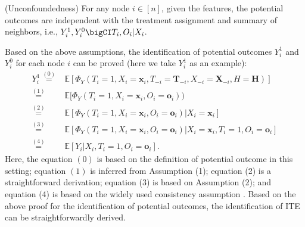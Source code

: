 \begin{assumption}
(Unconfoundedness) For any node $i\in[n]$, given the features, the potential outcomes are independent with the treatment assignment and summary of neighbors, i.e., $Y_i^1,Y_i^0 \bigCI T_i, O_i | {X}_i$. \label{assumption:unconfoundeness}
\end{assumption}

Based on the above assumptions, the identification of potential outcomes $Y_i^{1}$ and $Y_i^{0}$ for each node $i$ can be proved (here we take $Y_i^{1}$ as an example):
\begin{align}
Y_i^{1} \overset{(0)}{=}&\mathbb{E}[\Phi_Y(T_i=1, X_i=\mathbf{x}_i, T_{-i}=\mathbf{T}_{-i},{X}_{-i}=\mathbf{X}_{-i},H=\mathbf{H})] \\\overset{(1)}{=}& \mathbb{E}[\Phi_Y(T_i=1, X_i=\mathbf{x}_i, O_i=\mathbf{o}_i)) \\
\overset{(2)}{=} &\mathbb{E}[\Phi_Y(T_i=1, X_i=\mathbf{x}_i, O_i=\mathbf{o}_i)|X_i=\mathbf{x}_i] \\
\overset{(3)}{=} &\mathbb{E}[\Phi_Y(T_i=1, X_i=\mathbf{x}_i, O_i=\mathbf{o}_i)|X_i=\mathbf{x}_i, T_i=1,O_i=\mathbf{o}_i] \\
\overset{(4)}{=} &\mathbb{E}[Y_i|X_i, T_i=1,O_i=\mathbf{o}_i].
\end{align}
Here, the equation $(0)$ is based on the definition of potential outcome in this setting; equation $(1)$ is inferred from Assumption (1); equation (2) is a straightforward derivation; equation (3) is based on Assumption (2); and equation (4) is based on the widely used consistency assumption \cite{rubin1980randomization}. Based on the above proof for the identification of potential outcomes, the identification of ITE can be straightforwardly derived.
